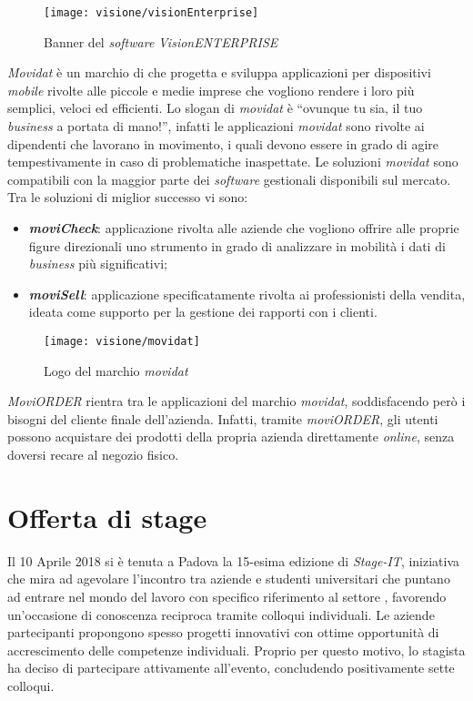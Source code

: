 \begin{figure}[!h] 
    \centering 
    \texttt{[image: visione/visionEnterprise]} 
    \caption{Banner del \textit{software} \textit{VisionENTERPRISE}}
\end{figure}

\textit{Movidat} è un marchio di \visione{} che progetta e sviluppa applicazioni per dispositivi \textit{mobile} rivolte alle piccole e medie imprese che vogliono rendere i loro  più semplici, veloci ed efficienti. Lo slogan di \textit{movidat} è ``ovunque tu sia, il tuo \textit{business} a portata di mano!'', infatti le applicazioni \textit{movidat} sono rivolte ai dipendenti che lavorano in movimento, i quali devono essere in grado di agire tempestivamente in caso di problematiche inaspettate. Le soluzioni \textit{movidat} sono compatibili con la maggior parte dei \textit{software} gestionali disponibili sul mercato. Tra le soluzioni di miglior successo vi sono:
\begin{itemize}
	\item \textbf{\textit{moviCheck}}: applicazione rivolta alle aziende che vogliono offrire alle proprie figure direzionali uno strumento in grado di analizzare in mobilità i dati di \textit{business} più significativi;
	\item \textbf{\textit{moviSell}}: applicazione specificatamente rivolta ai professionisti della vendita, ideata come supporto per la gestione dei rapporti con i clienti.
\end{itemize}

\begin{figure}[!h] 
    \centering 
    \texttt{[image: visione/movidat]} 
    \caption{Logo del marchio \textit{movidat}}
\end{figure}

\textit{MoviORDER} rientra tra le applicazioni del marchio \textit{movidat}, soddisfacendo però i bisogni del cliente finale dell'azienda. Infatti, tramite \textit{moviORDER}, gli utenti possono acquistare dei prodotti della propria azienda direttamente \textit{online}, senza doversi recare al negozio fisico.

\section{Offerta di stage}

Il 10 Aprile 2018 si è tenuta a Padova la 15-esima edizione di \textit{Stage-IT}, iniziativa che mira ad agevolare l'incontro tra aziende e studenti universitari che puntano ad entrare nel mondo del lavoro con specifico riferimento al settore , favorendo un'occasione di conoscenza reciproca tramite colloqui individuali. Le aziende partecipanti propongono spesso progetti innovativi con ottime opportunità di accrescimento delle competenze individuali. Proprio per questo motivo, lo stagista ha deciso di partecipare attivamente all'evento, concludendo positivamente sette colloqui. 

